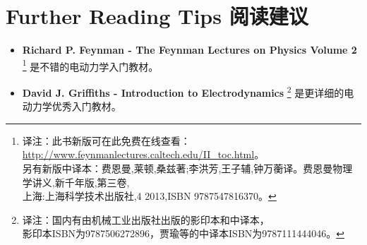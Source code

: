 \section*{Further Reading Tips \quad 阅读建议}
\begin{itemize}
    \item {\bfseries Richard P. Feynman - The Feynman Lectures on Physics Volume 2}%
    \footnote{译注：此书新版可在此免费在线查看： \url{http://www.feynmanlectures.caltech.edu/II_toc.html}。\\另有新版中译本：费恩曼,莱顿,桑兹著;李洪芳,王子辅,钟万蘅译。费恩曼物理学讲义,新千年版,第三卷,\\上海:上海科学技术出版社,4 2013,ISBN 9787547816370。} %
    是不错的电动力学入门教材。
    \item {\bfseries David J. Griffiths - Introduction to Electrodynamics}%
    \footnote{译注：国内有由机械工业出版社出版的影印本和中译本，\\影印本ISBN为9787506272896，贾瑜等的中译本ISBN为9787111444046。}%
    是更详细的电动力学优秀入门教材。
\end{itemize}
